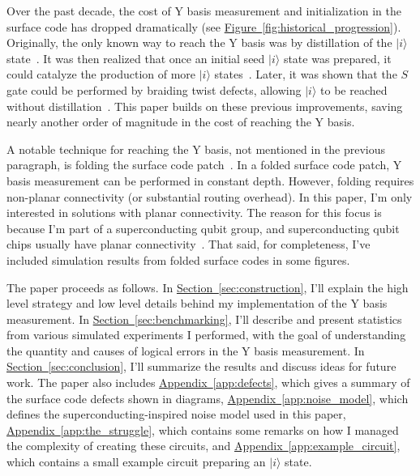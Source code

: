 \documentclass[onecolumn,unpublished,a4paper]{quantumarticle}
\theoremstyle{definition}
\theoremstyle{definition}
\theoremstyle{definition}
\renewcommand{\sec}[1]{\hyperref[sec:#1]{Section~\ref*{sec:#1}}}
\DeclareRobustCommand{\app}[1]{\hyperref[app:#1]{Appendix~\ref*{app:#1}}}
\newcommand{\fig}[1]{\hyperref[fig:#1]{Figure~\ref*{fig:#1}}}
\begin{document}
Over the past decade, the cost of Y basis measurement and initialization in the surface code has dropped dramatically (see \fig{historical_progression}).
Originally, the only known way to reach the Y basis was by distillation of the $|i\rangle$ state~\cite{aliferis2005quantum,fowler2012surfacecodereview,fowler2012bridge}.
It was then realized that once an initial seed $|i\rangle$ state was prepared, it could catalyze the production of more $|i\rangle$ states~\cite{fowler2012surfacecodereview,gidney2017slightly}.
Later, it was shown that the $S$ gate could be performed by braiding twist defects, allowing $|i\rangle$ to be reached without distillation~\cite{brown2017surfacetwists,bombin2021logical,chamberland2022universal}.
This paper builds on these previous improvements, saving nearly another order of magnitude in the cost of reaching the Y basis.

A notable technique for reaching the Y basis, not mentioned in the previous paragraph, is folding the surface code patch~\cite{moussa2016folded}.
In a folded surface code patch, Y basis measurement can be performed in constant depth.
However, folding requires non-planar connectivity (or substantial routing overhead).
In this paper, I'm only interested in solutions with planar connectivity.
The reason for this focus is because I'm part of a superconducting qubit group, and superconducting qubit chips usually have planar connectivity~\cite{Andersen2020,googlerepcode2021,Zhao2022}.
That said, for completeness, I've included simulation results from folded surface codes in some figures.

The paper proceeds as follows.
In \sec{construction}, I'll explain the high level strategy and low level details behind my implementation of the Y basis measurement.
In \sec{benchmarking}, I'll describe and present statistics from various simulated experiments I performed, with the goal of understanding the quantity and causes of logical errors in the Y basis measurement.
In \sec{conclusion}, I'll summarize the results and discuss ideas for future work.
The paper also includes \app{defects}, which gives a summary of the surface code defects shown in diagrams, \app{noise_model}, which defines the superconducting-inspired noise model used in this paper, \app{the_struggle}, which contains some remarks on how I managed the complexity of creating these circuits, and \app{example_circuit}, which contains a small example circuit preparing an $|i\rangle$ state.
\end{document}
